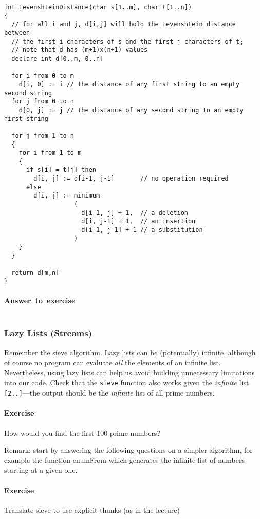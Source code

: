 \documentclass{article}
\newcommand{\percents}[1]{\protect \marginpar[l]{\bf [#1]}}
\newcounter{question}
\newcommand{\question}[1]{
  \addtocounter{question}{1}
  \paragraph{Exercise~\arabic{question}  \percents{#1}}
 }
\newenvironment{ex}[1]{\question{#1}}{\vspace{1em}}
\newenvironment{ans}{\begin{framed}\paragraph{Answer~to~exercise~\arabic{question}}}{\end{framed}}
\newcommand{\correctedLastYear}[1]{}
\begin{document}
\begin{verbatim}
int LevenshteinDistance(char s[1..m], char t[1..n])
{
  // for all i and j, d[i,j] will hold the Levenshtein distance between
  // the first i characters of s and the first j characters of t;
  // note that d has (m+1)x(n+1) values
  declare int d[0..m, 0..n]

  for i from 0 to m
    d[i, 0] := i // the distance of any first string to an empty second string
  for j from 0 to n
    d[0, j] := j // the distance of any second string to an empty first string

  for j from 1 to n
  {
    for i from 1 to m
    {
      if s[i] = t[j] then
        d[i, j] := d[i-1, j-1]       // no operation required
      else
        d[i, j] := minimum
                   (
                     d[i-1, j] + 1,  // a deletion
                     d[i, j-1] + 1,  // an insertion
                     d[i-1, j-1] + 1 // a substitution
                   )
    }
  }

  return d[m,n]
}
\end{verbatim}

\begin{ans}
\inputminted{haskell}{Diff.hs}
\end{ans}

\subsubsection{Lazy Lists (Streams)}

Remember the sieve algorithm. Lazy lists can be (potentially)
infinite, although of course no program can evaluate {\em all} the
elements of an infinite list. Nevertheless, using lazy lists can help
us avoid building unnecessary limitations into our code.  Check that
the \verb!sieve! function also works given the {\em infinite} list
\verb![2..]!---the output should be the {\em infinite} list of all
prime numbers.


\begin{ex}{*\correctedLastYear5}
How would you find the first 100 prime numbers?
\end{ex}

Remark: start by answering the following questions on a simpler
algorithm, for example the function \textsf{enumFrom} which generates
the infinite list of numbers starting at a given one.

\begin{ex}{*\correctedLastYear5} Translate sieve to use explicit thunks (as in the lecture)
\end{ex}
\end{document}
